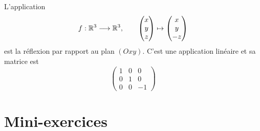 \begin{frame}

\bigskip

L'application 
$$
f: \mathbb{R}^3  \longrightarrow \mathbb{R}^3, \qquad \begin{pmatrix}x\\y\\z\end{pmatrix} \mapsto \begin{pmatrix}x\\y\\-z\end{pmatrix}$$
est la réflexion par rapport au plan $(Oxy)$. C'est une application linéaire et sa matrice est
\[ \begin{pmatrix}
1 & 0 & 0\\
0 & 1 & 0\\
0 & 0 & -1 
\end{pmatrix}
 \]
\end{frame}


\section{Mini-exercices}

